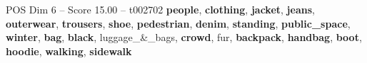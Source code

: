 \begin{textsample}{POS Dim 6 – Score 15.00 – t002702}  \label{ex:f6_pos_028}
\textbf{people}, \textbf{clothing}, \textbf{jacket}, \textbf{jeans}, \textbf{outerwear}, \textbf{trousers}, \textbf{shoe}, \textbf{pedestrian}, \textbf{denim}, \textbf{standing}, \textbf{public\_space}, \textbf{winter}, \textbf{bag}, \textbf{black}, luggage\_\&\_bags, \textbf{crowd}, fur, \textbf{backpack}, \textbf{handbag}, \textbf{boot}, \textbf{hoodie}, \textbf{walking}, \textbf{sidewalk}

\end{textsample}
